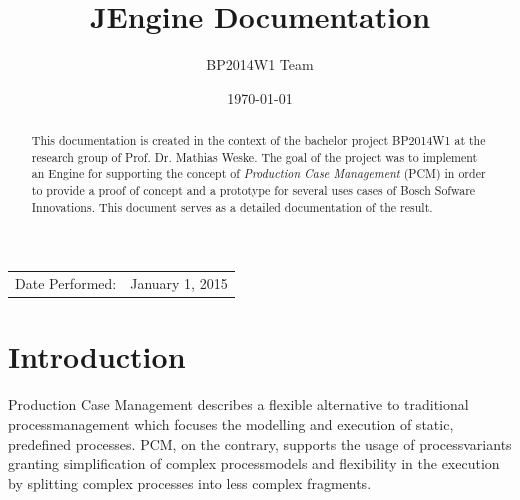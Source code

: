 \documentclass{article}
\title{JEngine Documentation} %
\author{BP2014W1 Team} %
\date{\today} %
\begin{document}
\maketitle %


\begin{center}
\begin{tabular}{l r}
Date Performed: & January 1, 2015 \\ %
\end{tabular}
\end{center}

\listoftodos %


\begin{abstract}
This documentation is created in the context of the bachelor project BP2014W1 at the research group of Prof. Dr. Mathias Weske. The goal of the project was to implement an Engine for supporting the concept of \textit{Production Case Management} (PCM) in order to provide a proof of concept and a prototype for several uses cases of Bosch Sofware Innovations. This document serves as a detailed documentation of the result.   
\end{abstract}




%
%
\section{Introduction}
Production Case Management describes a flexible alternative to traditional processmanagement which focuses the modelling and execution of static, predefined processes. PCM, on the contrary, supports the usage of processvariants granting simplification of complex processmodels and flexibility in the execution by splitting complex processes into less complex fragments.
\end{document}
